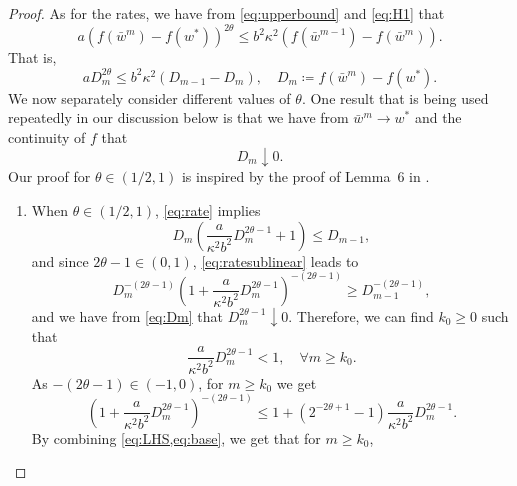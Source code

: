 \documentclass{article}
\newcommand{\alerttt}[1]{{#1}}
\theoremstyle{plain}
\theoremstyle{definition}
\theoremstyle{remark}
\begin{document}
\begin{proof}
	As for the rates, we have from \cref{eq:upperbound} and \cref{eq:H1} that 
	\[a(f(\bar{w}^m)-f(w^*))^{\alerttt{2\theta}} \leq
		\alerttt{b^2\kappa^2} \left( 
		f(\bar{w}^{m-1}) - f (\bar{w}^m) \right). \]
	That is, 
	\begin{equation}
		aD_m^{\alerttt{2\theta}} \leq \alerttt{b^2\kappa^2}(D_{m-1}-D_m), \quad D_m \coloneqq 
		f(\bar{w}^m)-f(w^*).
		\label{eq:rate}
	\end{equation}
		We now separately consider different values of $\theta$.
		One result that is being used repeatedly in our discussion
		below is that we have from $\bar{w}^m \rightarrow w^*$ and the
		continuity of $f$ that
		\begin{equation}
			D_m \downarrow 0.
			\label{eq:Dm}
		\end{equation}
		Our proof for $\theta \in \alerttt{(1/2,1)}$ is inspired by the proof of
		Lemma~6 in \cite[Chapter~2.2]{Pol87a}.
		\begin{enumerate}[leftmargin=*]
			\item[(a)] When $\theta \in \alerttt{(1/2,1)}$,
				\cref{eq:rate} implies
				\begin{equation}
					D_m\left(\frac{a }{\alerttt{\kappa^2} b^2}
					D_m^{\alerttt{2\theta-1}}
					+ 1 \right) \leq D_{m-1},
					\label{eq:ratesublinear}
				\end{equation}
				and since $\alerttt{2\theta-1} \in (0,1)$,
				\cref{eq:ratesublinear} leads to
				\begin{equation}
					\label{eq:base}
					D_m^{-(\alerttt{2\theta-1})}
					\left( 1 + \frac{a }{\alerttt{\kappa^2}b^2}
					D_m^{\alerttt{
					2\theta-1}}\right)^{-\alerttt{(2\theta-1)}}
					\geq D_{m-1}^{-(
					\alerttt{2\theta-1})},
				\end{equation}
				and we have from \cref{eq:Dm} that
				$D_m^{\alerttt{2\theta-1}}
				\downarrow 0$.
				Therefore, we can find $k_0 \geq 0$ such that
				\[
					\frac{a }{\alerttt{\kappa^2}b^2}
					D_m^{\alerttt{2\theta-1}} < 1,
					\quad \forall m \geq k_0.
				\]
				As $-(\alerttt{2\theta-1}) \in (-1,0)$, for $m
				\geq k_0$ we get
				\begin{equation}
					\left( 1 + \frac{a }{\alerttt{\kappa^2}b^2}
					D_m^{\alerttt{
					2\theta-1}}\right)^{-(\alerttt{2\theta-1})} \leq 1
					+ (2^{\alerttt{-
					2\theta+1}} - 1) \frac{a }{\alerttt{\kappa^2}b^2}D_m^{
					\alerttt{2\theta-1}}.
					\label{eq:LHS}
				\end{equation}
				By combining \cref{eq:LHS,eq:base}, we get that for $m
				\geq k_0$,
				\begin{equation}

\end{equation}
\end{enumerate}
\end{proof}
\end{document}
